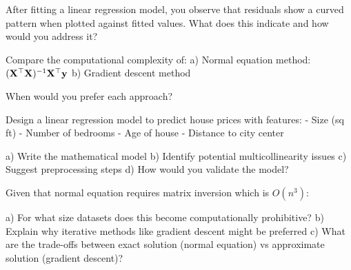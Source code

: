 \documentclass{article}
\newcounter{exercise}
\begin{document}
\begin{tcolorbox}[colback=gray!5!white,colframe=gray!75!black,title=Problem \stepcounter{exercise}: Residual Analysis]

After fitting a linear regression model, you observe that residuals show a curved pattern when plotted against fitted values. What does this indicate and how would you address it?
\end{tcolorbox}

\begin{tcolorbox}[colback=gray!5!white,colframe=gray!75!black,title=Problem \stepcounter{exercise}: Computational Complexity]

Compare the computational complexity of:
a) Normal equation method: $(\mathbf{X}^\top \mathbf{X})^{-1} \mathbf{X}^\top \mathbf{y}$
b) Gradient descent method

When would you prefer each approach?
\end{tcolorbox}

\begin{tcolorbox}[colback=gray!5!white,colframe=gray!75!black,title=Problem \stepcounter{exercise}: Real-world Application]

Design a linear regression model to predict house prices with features:
- Size (sq ft)
- Number of bedrooms  
- Age of house
- Distance to city center

a) Write the mathematical model
b) Identify potential multicollinearity issues
c) Suggest preprocessing steps
d) How would you validate the model?
\end{tcolorbox}

\begin{tcolorbox}[colback=gray!5!white,colframe=gray!75!black,title=Problem \stepcounter{exercise}: Advanced Challenge]

Given that normal equation requires matrix inversion which is $O(n^3)$:

a) For what size datasets does this become computationally prohibitive?
b) Explain why iterative methods like gradient descent might be preferred
c) What are the trade-offs between exact solution (normal equation) vs approximate solution (gradient descent)?
\end{tcolorbox}
\end{document}
